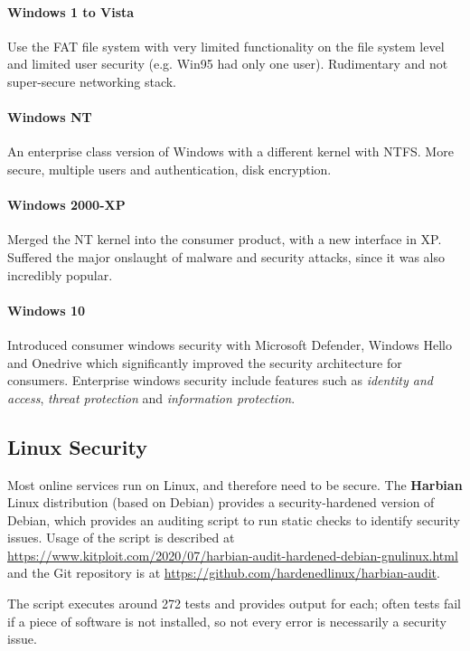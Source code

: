 \paragraph{Windows 1 to Vista} Use the FAT file system with very limited functionality on the file system level and limited user security (e.g. Win95 had only one user). Rudimentary and not super-secure networking stack. 

\paragraph{Windows NT} An enterprise class version of Windows with a different kernel with NTFS. More secure, multiple users and authentication, disk encryption.

\paragraph{Windows 2000-XP} Merged the NT kernel into the consumer product, with a new interface in XP. Suffered the major onslaught of malware and security attacks, since it was also incredibly popular.

\paragraph{Windows 10} Introduced consumer windows security with Microsoft Defender, Windows Hello and Onedrive which significantly improved the security architecture for consumers. Enterprise windows security include features such as \textit{identity and access}, \textit{threat protection} and \textit{information protection}.

\subsection{Linux Security}

Most online services run on Linux, and therefore need to be secure. The \textbf{Harbian} Linux distribution (based on Debian) provides a security-hardened version of Debian, which provides an auditing script to run static checks to identify security issues. Usage of the script is described at \url{https://www.kitploit.com/2020/07/harbian-audit-hardened-debian-gnulinux.html} and the Git repository is at \url{https://github.com/hardenedlinux/harbian-audit}.

The script executes around 272 tests and provides output for each; often tests fail if a piece of software is not installed, so not every error is necessarily a security issue.

